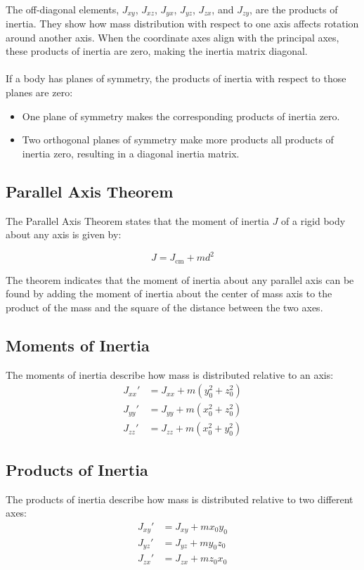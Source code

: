 \\
The off-diagonal elements, \( J_{xy} \), \( J_{xz} \), \( J_{yx} \), \( J_{yz} \), \( J_{zx} \), and \( J_{zy} \), are the products of inertia. They show how mass distribution with respect to one axis affects rotation around another axis. When the coordinate axes align with the principal axes, these products of inertia are zero, making the inertia matrix diagonal.
\\
\\
If a body has planes of symmetry, the products of inertia with respect to those planes are zero:
\begin{itemize}
    \item One plane of symmetry makes the corresponding products of inertia zero.
    \item Two orthogonal planes of symmetry make more products all products of inertia zero, resulting in a diagonal inertia matrix.
\end{itemize}

\subsection{Parallel Axis Theorem}
The Parallel Axis Theorem states that the moment of inertia \(J\) of a rigid body about any axis is given by:

\[
J = J_{\text{cm}} + m d^2
\]

The theorem indicates that the moment of inertia about any parallel axis can be found by adding the moment of inertia about the center of mass axis to the product of the mass and the square of the distance between the two axes.


\subsection{Moments of Inertia}
The moments of inertia describe how mass is distributed relative to an axis:
\begin{align*}
    J_{xx}' &= J_{xx} + m (y_0^2 + z_0^2) \\
    J_{yy}' &= J_{yy} + m (x_0^2 + z_0^2) \\
    J_{zz}' &= J_{zz} + m (x_0^2 + y_0^2)
\end{align*}

\subsection{Products of Inertia}
The products of inertia describe how mass is distributed relative to two different axes:
\begin{align*}
    J_{xy}' &= J_{xy} + m x_0 y_0 \\
    J_{yz}' &= J_{yz} + m y_0 z_0 \\
    J_{zx}' &= J_{zx} + m z_0 x_0
\end{align*}


